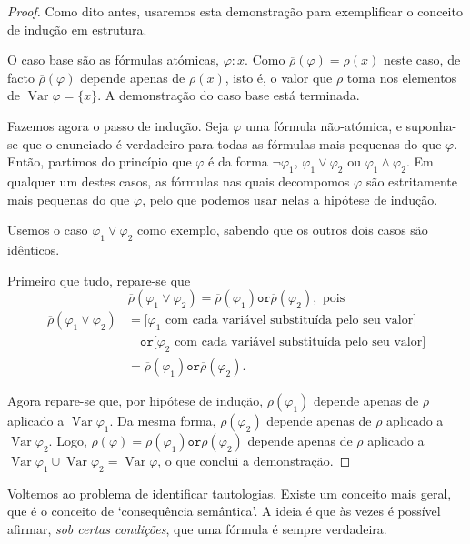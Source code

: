 \documentclass{report}
\theoremstyle{definition}
\theoremstyle{remark}
\DeclareMathOperator{\var}{Var}
\newcommand{\por}{\mathbin{\texttt{or}}}
\begin{document}
	\begin{proof}
	Como dito antes, usaremos esta demonstração para exemplificar o conceito de indução em estrutura.
	
	O caso base são as fórmulas atómicas, $\varphi : x$. Como $\overline\rho(\varphi) = \rho(x)$ neste caso, de facto $\overline\rho(\varphi)$ depende apenas de $\rho(x)$, isto é, o valor que $\rho$ toma nos elementos de $\var \varphi = \{x\}$. A demonstração do caso base está terminada.
	
	Fazemos agora o passo de indução. Seja $\varphi$ uma fórmula não-atómica, e suponha-se que o enunciado é verdadeiro para todas as fórmulas mais pequenas do que $\varphi$. Então, partimos do princípio que $\varphi$ é da forma $\neg \varphi_1$, $\varphi_1 \lor \varphi_2$ ou $\varphi_1 \land \varphi_2$. Em qualquer um destes casos, as fórmulas nas quais decompomos $\varphi$ são estritamente mais pequenas do que $\varphi$, pelo que podemos usar nelas a hipótese de indução.
	
	Usemos o caso $\varphi_1 \lor \varphi_2$ como exemplo, sabendo que os outros dois casos são idênticos.
	
	Primeiro que tudo, repare-se que
	\[\overline\rho(\varphi_1 \lor \varphi_2) = \overline\rho(\varphi_1) \por \overline\rho(\varphi_2),\text{ pois}\]
	\begin{align*}
	\overline\rho(\varphi_1 \lor \varphi_2) &= \text{[$\varphi_1$ com cada variável substituída pelo seu valor]}\\
	&\quad\por \text{[$\varphi_2$ com cada variável substituída pelo seu valor]}\\
	&= \overline\rho(\varphi_1) \por \overline\rho(\varphi_2).
	\end{align*}
	
	Agora repare-se que, por hipótese de indução, $\overline\rho(\varphi_1)$ depende apenas de $\rho$ aplicado a $\var \varphi_1$. Da mesma forma, $\overline\rho(\varphi_2)$ depende apenas de $\rho$ aplicado a $\var \varphi_2$. Logo, $\overline\rho(\varphi) = \overline\rho(\varphi_1) \por \overline\rho(\varphi_2)$ depende apenas de $\rho$ aplicado a $\var \varphi_1 \cup \var \varphi_2 = \var \varphi$, o que conclui a demonstração.
	\end{proof}
	
	Voltemos ao problema de identificar tautologias. Existe um conceito mais geral, que é o conceito de `consequência semântica'. A ideia é que às vezes é possível afirmar, \emph{sob certas condições}, que uma fórmula é sempre verdadeira.
	
\end{document}
